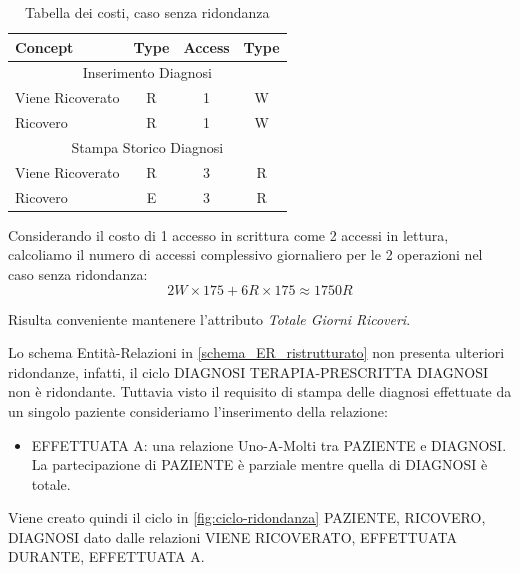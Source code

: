 \documentclass{article}
\begin{document}
\begin{table}[H]
	\centering
	\begin{tabular}{|l|c|c|c|}
		\hline
		\textbf{Concept} & \textbf{Type} & \textbf{Access} & \textbf{Type} \\ \hline
		\multicolumn{4}{|c|}{Inserimento Diagnosi}                         \\ \hline
		Viene Ricoverato & R             & 1               & W             \\ \hline
		Ricovero         & R             & 1               & W             \\ \hline
		\multicolumn{4}{|c|}{Stampa Storico Diagnosi}                      \\ \hline
		Viene Ricoverato & R             & 3               & R             \\ \hline
		Ricovero         & E             & 3               & R             \\ \hline
	\end{tabular}
	\caption{Tabella dei costi, caso senza ridondanza}
	\label{tab:costi-no-attributo-ridondante}
\end{table}

Considerando il costo di 1 accesso in scrittura come 2 accessi in lettura, calcoliamo il numero di accessi complessivo giornaliero per le 2 operazioni nel caso senza ridondanza:
\begin{equation}
	2W \times 175 + 6R \times 175 \approx 1750R
\end{equation}

Risulta conveniente mantenere l'attributo \textit{Totale Giorni Ricoveri}.

Lo schema Entità-Relazioni in \autoref{schema_ER_ristrutturato} non presenta ulteriori ridondanze, infatti, il ciclo DIAGNOSI TERAPIA-PRESCRITTA DIAGNOSI non è ridondante. Tuttavia visto il requisito di stampa delle diagnosi effettuate da un singolo paziente consideriamo l'inserimento della relazione:
\begin{itemize}
	\item EFFETTUATA A: una relazione Uno-A-Molti tra PAZIENTE
	      e DIAGNOSI. La partecipazione di PAZIENTE è parziale mentre quella
	      di DIAGNOSI è totale.
\end{itemize}

Viene creato quindi il ciclo in \autoref{fig:ciclo-ridondanza} PAZIENTE, RICOVERO, DIAGNOSI dato dalle relazioni VIENE RICOVERATO, EFFETTUATA DURANTE, EFFETTUATA A.
\end{document}
